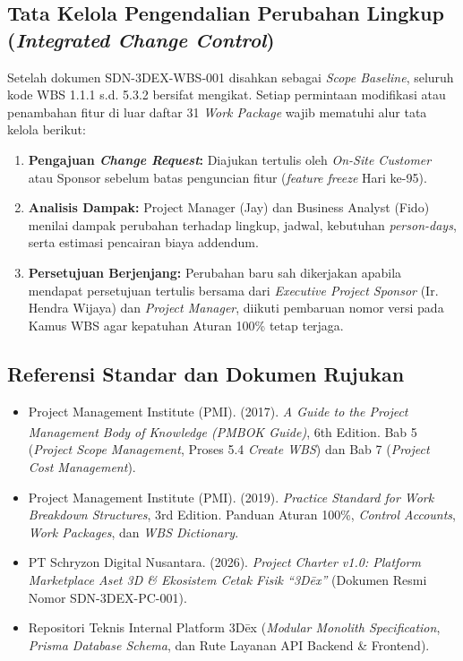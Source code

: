 \documentclass[11pt,a4paper]{article}
\begin{document}
\subsection{Tata Kelola Pengendalian Perubahan Lingkup (\textit{Integrated Change Control})}
Setelah dokumen SDN-3DEX-WBS-001 disahkan sebagai \textit{Scope Baseline}, seluruh kode WBS 1.1.1 s.d. 5.3.2 bersifat mengikat. Setiap permintaan modifikasi atau penambahan fitur di luar daftar 31 \textit{Work Package} wajib mematuhi alur tata kelola berikut:
\begin{enumerate}[leftmargin=1.5em, itemsep=1.5pt]
    \item \textbf{Pengajuan \textit{Change Request}:} Diajukan tertulis oleh \textit{On-Site Customer} atau Sponsor sebelum batas penguncian fitur (\textit{feature freeze} Hari ke-95).
    \item \textbf{Analisis Dampak:} Project Manager (Jay) dan Business Analyst (Fido) menilai dampak perubahan terhadap lingkup, jadwal, kebutuhan \textit{person-days}, serta estimasi pencairan biaya addendum.
    \item \textbf{Persetujuan Berjenjang:} Perubahan baru sah dikerjakan apabila mendapat persetujuan tertulis bersama dari \textit{Executive Project Sponsor} (Ir. Hendra Wijaya) dan \textit{Project Manager}, diikuti pembaruan nomor versi pada Kamus WBS agar kepatuhan Aturan 100\% tetap terjaga.
\end{enumerate}

\subsection{Referensi Standar dan Dokumen Rujukan}
\begin{itemize}[leftmargin=1.5em, itemsep=1.5pt]
    \item Project Management Institute (PMI). (2017). \textit{A Guide to the Project Management Body of Knowledge (PMBOK\textsuperscript{\textregistered} Guide)}, 6th Edition. Bab 5 (\textit{Project Scope Management}, Proses 5.4 \textit{Create WBS}) dan Bab 7 (\textit{Project Cost Management}).
    \item Project Management Institute (PMI). (2019). \textit{Practice Standard for Work Breakdown Structures}, 3rd Edition. Panduan Aturan 100\%, \textit{Control Accounts}, \textit{Work Packages}, dan \textit{WBS Dictionary}.
    \item PT Schryzon Digital Nusantara. (2026). \textit{Project Charter v1.0: Platform Marketplace Aset 3D \& Ekosistem Cetak Fisik ``3D\={e}x''} (Dokumen Resmi Nomor SDN-3DEX-PC-001).
    \item Repositori Teknis Internal Platform 3D\={e}x (\textit{Modular Monolith Specification}, \textit{Prisma Database Schema}, dan Rute Layanan API Backend \& Frontend).
\end{itemize}
\end{document}
